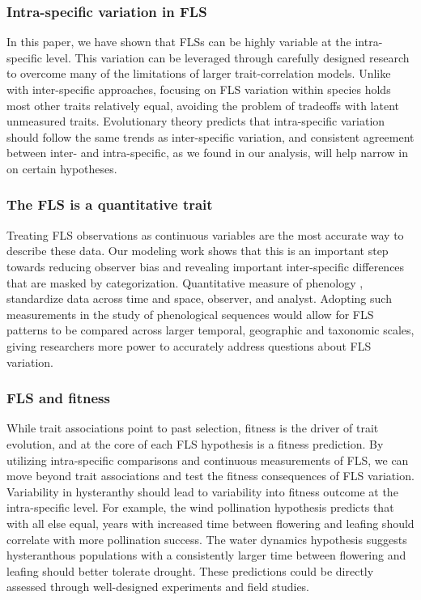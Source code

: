 \documentclass[12pt]{article}
\begin{document}
\subsubsection*{Intra-specific variation in FLS}
\indent\indent In this paper, we have shown that FLSs can be highly variable at the intra-specific level. This variation can be leveraged through carefully designed research to overcome many of the limitations of larger trait-correlation models. Unlike with inter-specific approaches, focusing on FLS variation within species holds most other traits relatively equal, avoiding the problem of tradeoffs with latent unmeasured traits. Evolutionary theory predicts that intra-specific variation should follow the same trends as inter-specific variation, and consistent agreement between inter- and intra-specific, as we found in our analysis, will help narrow in on certain hypotheses.\\
\subsubsection*{The FLS is a quantitative trait}
\indent \indent Treating FLS observations as continuous variables are the most accurate way to describe these data. Our modeling work shows that this is an important step towards reducing observer bias and revealing important inter-specific differences that are masked by categorization. Quantitative measure of phenology \citep[e.g. the BBCH scale,][]{Finn2007}, standardize data across time and space, observer, and analyst. Adopting such measurements in the study of phenological sequences would allow for FLS patterns to be compared across larger temporal, geographic and taxonomic scales, giving researchers more power to accurately address questions about FLS variation.
\subsubsection*{FLS and fitness}
\indent\indent While trait associations point to past selection, fitness is the driver of trait evolution, and at the core of each FLS hypothesis is a fitness prediction. By utilizing intra-specific comparisons and continuous measurements of FLS, we can move beyond trait associations and test the fitness consequences of FLS variation. \\
\indent Variability in hysteranthy should lead to variability into fitness outcome at the intra-specific level. For example, the wind pollination hypothesis predicts that with all else equal, years with increased time between flowering and leafing should correlate with more pollination success. The water dynamics hypothesis suggests hysteranthous populations with a consistently larger time between flowering and leafing should better tolerate drought. These predictions could be directly assessed through well-designed experiments and field studies.\\
\end{document}
